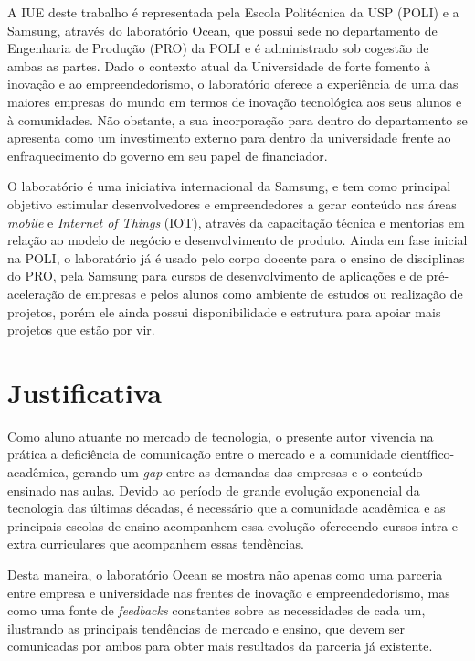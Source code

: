A IUE deste trabalho é representada pela Escola Politécnica da USP (POLI) e a Samsung, através do laboratório Ocean, que possui sede no departamento de Engenharia de Produção (PRO) da POLI e é administrado sob cogestão de ambas as partes. Dado o contexto atual da Universidade de forte fomento à inovação e ao empreendedorismo, o laboratório oferece a experiência de uma das maiores empresas do mundo em termos de inovação tecnológica aos seus alunos e à comunidades. Não obstante, a sua incorporação para dentro do departamento se apresenta como um investimento externo para dentro da universidade frente ao enfraquecimento do governo em seu papel de financiador.

O laboratório é uma iniciativa internacional da Samsung, e tem como principal objetivo estimular desenvolvedores e empreendedores a gerar conteúdo nas áreas \textit{mobile} e \textit{Internet of Things} (IOT), através da capacitação técnica e mentorias em relação ao modelo de negócio e desenvolvimento de produto. Ainda em fase inicial na POLI, o laboratório já é usado pelo corpo docente para o ensino de disciplinas do PRO, pela Samsung para cursos de desenvolvimento de aplicações e de pré-aceleração de empresas e pelos alunos como ambiente de estudos ou realização de projetos, porém ele ainda possui disponibilidade e estrutura para apoiar mais projetos que estão por vir.

\section{Justificativa}
\label{cha:justificativa}

Como aluno atuante no mercado de tecnologia, o presente autor vivencia na prática a deficiência de comunicação entre o mercado e a comunidade científico-acadêmica, gerando um \textit{gap} entre as demandas das empresas e o conteúdo ensinado nas aulas. Devido ao período de grande evolução exponencial da tecnologia das últimas décadas, é necessário que a comunidade acadêmica e as principais escolas de ensino acompanhem essa evolução oferecendo cursos intra e extra curriculares que acompanhem essas tendências.

Desta maneira, o laboratório Ocean se mostra não apenas como uma parceria entre empresa e universidade nas frentes de inovação e empreendedorismo, mas como uma fonte de \textit{feedbacks} constantes sobre as necessidades de cada um, ilustrando as principais tendências de mercado e ensino, que devem ser comunicadas por ambos para obter mais resultados da parceria já existente.

